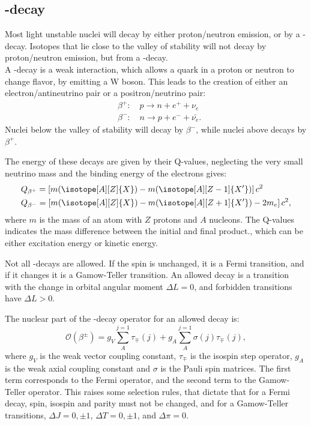 
\subsection{\be-decay}
\label{sec:beta}
Most light unstable nuclei will decay by either proton/neutron emission, or by a \be-decay. Isotopes that lie close to the valley of stability will not decay by proton/neutron emission, but from a \be-decay.
\\
A \be-decay is a weak interaction, which allows a quark in a proton or neutron to change flavor, by emitting a W boson. This leads to the creation of either an electron/antineutrino pair or a positron/neutrino pair:
\begin{align}
&\beta^+:\quad p\rightarrow n + e^+ + \nu_e\\
&\beta^-:\quad n\rightarrow p + e^- + \bar{\nu_e}.
\end{align}
Nuclei below the valley of stability will decay by $\beta^-$, while nuclei above decays by $\beta ^+$.

The energy of these decays are given by their Q-values, neglecting the very small neutrino mass and the binding energy of the electrons gives:
\begin{align}
&Q_{\beta^+} = \left[ m (\isotope[A][Z]{X}) - m(\isotope[A][Z-1]{X'})  		 \right] c^2\\
&Q_{\beta^-} = \left[ m (\isotope[A][Z]{X}) - m(\isotope[A][Z+1]{X'}) -2m_e  \right] c^2,
\end{align}
where $m$ is the mass of an atom with $Z$ protons and $A$ nucleons.
The Q-values indicates the mass difference between the initial and final product., which can be either excitation energy or kinetic energy. 

Not all \be-decays are allowed. If the spin is unchanged, it is a Fermi transition, and if it changes it is a Gamow-Teller transition. 
An allowed decay is a transition with the change in orbital angular moment $\Delta L = 0$, and forbidden transitions have $\Delta L > 0$.

The nuclear part of the \be-decay operator for an allowed decay is:
\begin{equation}
	\mathcal{O} (\beta^\pm) = g_V \sum_{A}^{j=1}\tau_\mp (j) + g_A \sum_{A}^{j=1}\sigma(j)\tau_\mp(j),
\end{equation}
where $g_V$ is the weak vector coupling constant, $\tau_\mp$ is the isospin step operator, $g_A$ is the weak axial coupling constant and $\sigma$ is the Pauli spin matrices.
The first term corresponds to the Fermi operator, and the second term to the Gamow-Teller operator. 
This raises some selection rules, that dictate that for a Fermi decay, spin, isospin and parity must not be changed, and for a Gamow-Teller transitions, $\Delta J = 0, \pm1$, $\Delta T = 0, \pm 1$, and $\Delta \pi = 0$.

